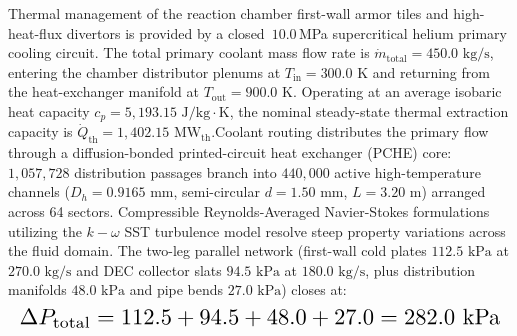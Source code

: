 \begin{sloppypar}
Thermal management of the reaction chamber first-wall armor tiles and high-heat-flux divertors is provided by a closed~$10.0$\,MPa supercritical helium primary cooling circuit. The total primary coolant mass flow rate is $\dot{m}_{\text{total}} = 450.0\text{ kg/s}$, entering the chamber distributor plenums at $T_{\text{in}} = 300.0\text{ K}$ and returning from the heat-exchanger manifold at $T_{\text{out}} = 900.0\text{ K}$. Operating at an average isobaric heat capacity $c_p = 5,193.15\text{ J/kg}\cdot\text{K}$, the nominal steady-state thermal extraction capacity is $\dot{Q}_{\text{th}} = 1,402.15\text{ MW}_{\text{th}}$.Coolant routing distributes the primary flow through a diffusion-bonded printed-circuit heat exchanger (PCHE) core: $1{,}057{,}728$ distribution passages branch into $440{,}000$ active high-temperature channels ($D_h = 0.9165\text{ mm}$, semi-circular $d = 1.50\text{ mm}$, $L = 3.20\text{ m}$) arranged across 64 sectors. Compressible Reynolds-Averaged Navier-Stokes formulations utilizing the $k-\omega$ SST turbulence model resolve steep property variations across the fluid domain. The two-leg parallel network (first-wall cold plates $112.5\text{ kPa}$ at $270.0\text{ kg/s}$ and DEC collector slats $94.5\text{ kPa}$ at $180.0\text{ kg/s}$, plus distribution manifolds $48.0\text{ kPa}$ and pipe bends $27.0\text{ kPa}$) closes at:\[
\resizebox{\columnwidth}{!}{$\displaystyle \Delta P_{\text{total}} = 112.5 + 94.5 + 48.0 + 27.0 = 282.0\text{ kPa}$}
\]

\end{sloppypar}
